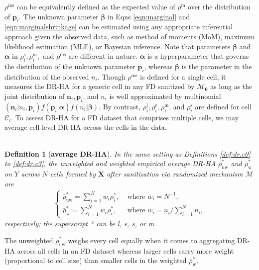 \documentclass[10pt,journal,compsoc]{IEEEtran}
\newtheorem{defn}{\vspace{-6pt}\\ Definition}
\newcommand{\M}{\mathcal{M}}
\newcommand{\p}{\mathbf{p}}
\newcommand{\n}{\mathbf{n}}
\newcommand{\X}{\mathbf{X}}
\newcommand{\C}{\mathcal{C}}
\newcommand{\bs}{\boldsymbol}
\begin{document}
$\rho^{\text{ms}}$ can be equivalently  defined as the expected value of $\rho^{\text{m}}$  over the distribution of $\p_i$. The unknown parameter $\bs\beta$ in Eqns \eqref{eqn:marginal} and \eqref{eqn:marginalshrinkage} can be estimated using  any appropriate inferential  approach given the observed data, such as method of moments (MoM), maximum likelihood estimation (MLE), or Bayesian inference. Note that parameters $\bs\beta$ and $\bs\alpha$  in $\rho_i^{\text{s}}, \rho_i^{\text{m}},$ and $\rho^{\text{ms}}$  are different in nature. $\bs\alpha$ is a hyperparameter that governs the distribution of the unknown parameter $\mathbf{p}_i$, whereas $\bs\beta$ is the parameter in the distribution of the observed $n_i$.  
Though $\rho^{\text{ms}}$ is defined for a single cell,  it  measures the DR-HA for a generic cell in any FD  sanitized by $\M_{\bs\theta}$ as long as the joint distribution of $\n_i, \p_i$, and $n_i$ is well approximated by multinomial$(\n_i|n_i,\p_i)f(\p_i|\bs\alpha)f(n_i|\bs\beta)$.  By contrast, $\rho_i^{\text{l}},\rho_i^{\text{e}}, \rho_i^{\text{m}}$, and $\rho_i^{\text{s}}$ are defined for cell $\C_i$. To assess DR-HA for a FD dataset that comprises multiple cells, we may average cell-level DR-HA across the cells in the data.\vspace{-3pt}
\begin{defn}[\textbf{average DR-HA}] \label{def:dr}
In the same setting as Definitions \ref{def:dr.c0} to \ref{def:dr.c3}, the unweighted and weighted empirical average DR-HA $\bar{\rho}_{\text{uw}}^*$ and $\bar{\rho}_{\text{w}}^*$ on $Y$ across $N$ cells formed by $\X\!$ after sanitization via randomized mechanism $\M$ are \vspace{-3pt}
\begin{align}
\begin{cases}\label{eqn:average}
\bar{\rho}_{\text{uw}}^*=\textstyle 
\!\sum_{i=1}^Nw_i\rho^*_i, & \mbox{ where }w_i=N^{-1}, \\
\bar{\rho}_{\text{w}}^*=\textstyle\sum_{i=1}^N w_i \rho^*_i,
&\mbox{ where }w_i= n_i/\sum_{i=1}^Nn_i, 
\end{cases}
\end{align} 
respectively; the superscript * can be  l, e, s, or m.
\end{defn}
The unweighted $\bar{\rho}_{\text{uw}}^*$ weighs every cell equally when it comes to aggregating DR-HA across all cells in an FD dataset whereas larger cells carry more weight (proportional to cell size) than smaller cells in the weighted $\bar{\rho}_{\text{w}}^*$. 
\end{document}

